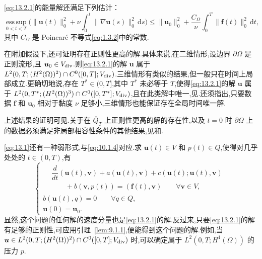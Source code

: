 \eqref{eq:13.2.1}的能量解还满足下列估计：
\begin{equation}\label{eq:13.2.2}
  \operatorname*{ess\,sup}_{0<t<T}\biggl(
     \|\boldsymbol{u}(t)\|_0^2+\nu\int_0^t\|\nabla\boldsymbol{u}(s)\|_0^2\,\mathrm ds\biggr)
     \le\|\boldsymbol{u}_0\|_0^2+\frac{C_\Omega}{\nu}
       \int_0^T\|\boldsymbol{f}(t)\|_0^2\,\mathrm dt,
\end{equation}
其中 \(C_\Omega\) 是 Poincaré 不等式\eqref{eq:1.3.2}中的常数.

在附加假设下,还可证明存在正则性更高的解.具体来说,在二维情形,设边界 \(\partial\Omega\) 是正则流形,且 \(\boldsymbol{u}_0\in V_{\rm div}\).则\eqref{eq:13.2.1}的解 \(\boldsymbol{u}\) 属于 \(L^2(0,T;(H^2(\Omega))^2)\cap C^0([0,T];V_{\rm div})\).三维情形有类似的结果,但一般只在时间上局部成立.更确切地说,存在 \(T^*\in(0,T]\),其中 \(T^*\) 未必等于 \(T\),使得\eqref{eq:13.2.1}的解 \(\boldsymbol{u}\) 属于 \(L^2(0,T^*;(H^2(\Omega))^3)\cap C^0([0,T^*];V_{\rm div})\),且在此类解中唯一,见.还须指出,只要数据 \(\boldsymbol{f}\) 和 \(\boldsymbol{u}_0\) 相对于黏度 \(\nu\) 足够小,三维情形也能保证存在全局时间唯一解.

上述结果的证明可见.关于在 \(\overline Q_T\) 上正则性更高的解的存在性,以及 \(t=0\) 时 \(\partial\Omega\) 上的数据必须满足非局部相容性条件的其他结果,见和.

\eqref{eq:13.1}还有一种弱形式,与\eqref{eq:10.1.4}对应.求 \(\boldsymbol{u}(t)\in V\) 和 \(p(t)\in Q\),使得对几乎处处的 \(t\in(0,T)\),有
\begin{equation}\label{eq:13.2.3}
  \begin{cases}
    \begin{aligned}
      &\dfrac{d}{dt}(\boldsymbol{u}(t),\boldsymbol{v})+a(\boldsymbol{u}(t),\boldsymbol{v})
            +c(\boldsymbol{u}(t);\boldsymbol{u}(t),\boldsymbol{v})\\
      &\qquad+b(\boldsymbol{v},p(t))=(\boldsymbol{f}(t),\boldsymbol{v})
           \qquad\forall\boldsymbol{v}\in V,
    \end{aligned}\\[2pt]
    b(\boldsymbol{u}(t),q)=0 \qquad\forall q\in Q,\\
    \boldsymbol{u}(0)=\boldsymbol{u}_0.
  \end{cases}
\end{equation}
显然,这个问题的任何解的速度分量也是\eqref{eq:13.2.1}的解.反过来,只要\eqref{eq:13.2.1}的解有足够的正则性,可应用引理~\ref{lem:9.1.1},便能得到这个问题的解.例如,当 \(\boldsymbol{u}\in L^2(0,T;(H^2(\Omega))^2)\cap C^0([0,T];V_{\rm div})\) 时,可以确定属于 \(L^2(0,T;H^1(\Omega))\) 的压力 \(p\).

